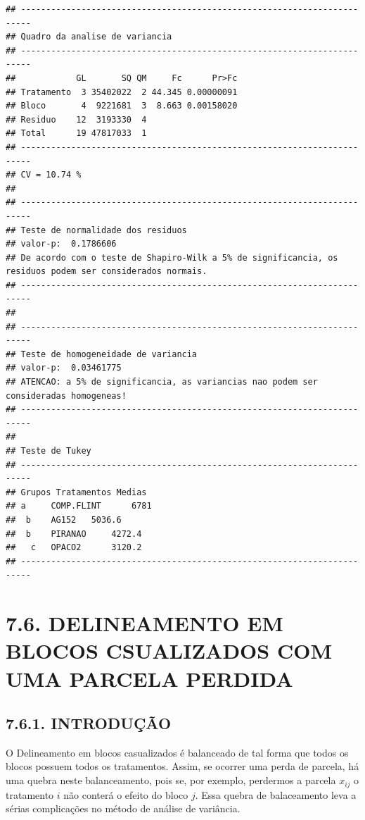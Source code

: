\documentclass[
]{book}
\begin{document}
\begin{verbatim}
## ------------------------------------------------------------------------
## Quadro da analise de variancia
## ------------------------------------------------------------------------
##            GL       SQ QM     Fc      Pr>Fc
## Tratamento  3 35402022  2 44.345 0.00000091
## Bloco       4  9221681  3  8.663 0.00158020
## Residuo    12  3193330  4                  
## Total      19 47817033  1                  
## ------------------------------------------------------------------------
## CV = 10.74 %
## 
## ------------------------------------------------------------------------
## Teste de normalidade dos residuos 
## valor-p:  0.1786606 
## De acordo com o teste de Shapiro-Wilk a 5% de significancia, os residuos podem ser considerados normais.
## ------------------------------------------------------------------------
## 
## ------------------------------------------------------------------------
## Teste de homogeneidade de variancia 
## valor-p:  0.03461775 
## ATENCAO: a 5% de significancia, as variancias nao podem ser consideradas homogeneas!
## ------------------------------------------------------------------------
## 
## Teste de Tukey
## ------------------------------------------------------------------------
## Grupos Tratamentos Medias
## a 	 COMP.FLINT 	 6781 
##  b 	 AG152 	 5036.6 
##  b 	 PIRANAO 	 4272.4 
##   c 	 OPACO2 	 3120.2 
## ------------------------------------------------------------------------
\end{verbatim}

\hypertarget{delineamento-em-blocos-csualizados-com-uma-parcela-perdida}{%
\section{7.6. DELINEAMENTO EM BLOCOS CSUALIZADOS COM UMA PARCELA PERDIDA}\label{delineamento-em-blocos-csualizados-com-uma-parcela-perdida}}

\hypertarget{introduuxe7uxe3o}{%
\subsection{7.6.1. INTRODUÇÃO}\label{introduuxe7uxe3o}}

O Delineamento em blocos casualizados é balanceado de tal forma que todos os blocos possuem todos os tratamentos. Assim, se ocorrer uma perda de parcela, há uma quebra neste balanceamento, pois se, por exemplo, perdermos a parcela \(x_{ij}\) o tratamento \(i\) não conterá o efeito do bloco \(j\). Essa quebra de balaceamento leva a sérias complicações no método de análise de variância.
\end{document}
